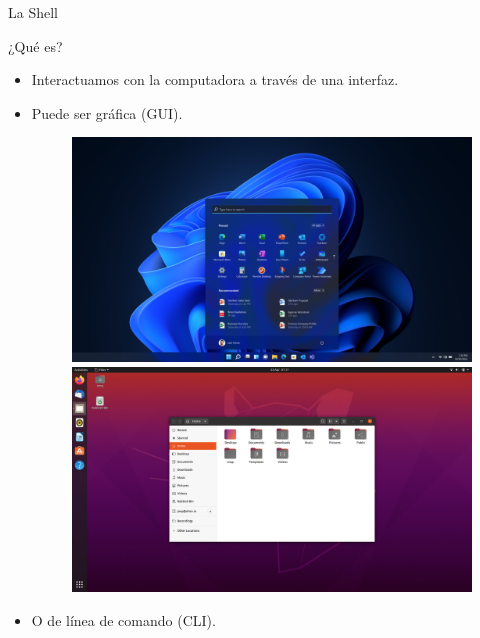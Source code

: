 \begin{frame}{La Shell}
\begin{block}{¿Qué es?}
    \begin{itemize}
        \item Interactuamos con la computadora a través de una interfaz.
        \pause
        \item Puede ser gráfica (GUI).
            \begin{figure}
            \begin{minipage}{.5\textwidth}
              \includegraphics[width=.8\linewidth]{images/windows-gui.png}
            \end{minipage}%
            \begin{minipage}{.5\textwidth}
              \includegraphics[width=.8\linewidth]{images/ubuntu-gui.jpg}
            \end{minipage}
            \end{figure}
        \pause
        \item O de línea de comando (CLI).
    \end{itemize}
\end{block}

\end{frame}

